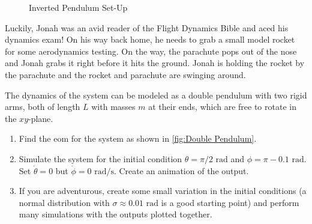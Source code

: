 \begin{exercise}
\begin{figure}[H]

    \caption{Inverted Pendulum Set-Up}
    \label{fig:Inverted Pendulum}
\end{figure}
\end{exercise}
\newpage
\begin{exercise}\label{exer_doublepend}
Luckily,  Jonah was an avid reader of the Flight Dynamics Bible and aced his dynamics exam! On his way back home, he needs to grab a small model rocket for some aerodynamics testing. On the way, the parachute pops out of the nose and Jonah grabs it right before it hits the ground. Jonah is holding the rocket by the parachute and the rocket and parachute are swinging around.

The dynamics of the system can be modeled as a double pendulum with two rigid arms, both of length $L$ with masses $m$ at their ends, which are free to rotate in the $xy$-plane. 
\begin{enumerate}
    \item Find the \gls{eom} for the system as shown in \autoref{fig:Double Pendulum}.
    \item Simulate the system for the initial condition $\theta=\pi/2 \text{ rad}$ and $\phi=\pi-0.1 \text{ rad}$. Set $\dot{\theta}=0$ but $\dot{\phi}=0 \text{ rad/s}$. Create an animation of the output.
    \item If you are adventurous, create some small variation in the initial conditions (a normal distribution with $\sigma\approx0.01  \text{ rad}$ is a good starting point) and perform many simulations with the outputs plotted together.
\end{enumerate}

\begin{figure}[H]
    \centering




\begin{tikzpicture}[x=0.75pt,y=0.75pt,yscale=-1,xscale=1]


\end{tikzpicture}
\end{figure}
\end{exercise}
